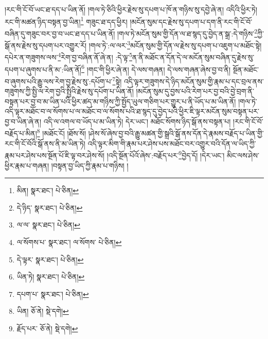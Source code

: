 །རང་གི་ངོ་བོ་ཡང་ཐ་དད་པ་ཡིན་ནོ། །གལ་ཏེ་ཅིའི་ཕྱིར་རྗེས་སུ་དཔག་པ་ཁོ་ན་གཉིས་སུ་དབྱེ་ཞེ་ན། འདིའི་ཕྱིར་ཏེ། རང་གི་མཚན་ཉིད་བསྟན་བྱ་ཡིན།\footnote{མིན།  སྣར་ཐང་།  པེ་ཅིན། } གཟུང་ཐ་དད་ཕྱིར། །མངོན་སུམ་དང་རྗེས་སུ་དཔག་པ་དག་ནི་རང་གི་ངོ་བོ་བཞིན་དུ་གཟུང་བར་བྱ་བ་ཡང་ཐ་དད་པ་ཡིན་ནོ། །གལ་ཏེ་མངོན་སུམ་གྱི་དོན་ལ་ཐ་སྙད་དུ་བྱེད་ན་སྒྲ་:དེ་གཉིས་\footnote{དེ་ཉིད་  སྣར་ཐང་།  པེ་ཅིན། }ཀྱི་སྒོ་ནས་རྗེས་སུ་དཔག་པར་འགྱུར་རོ། །གལ་ཏེ་:ལ་ལར་\footnote{ལ་ལ་  སྣར་ཐང་།  པེ་ཅིན། }མངོན་སུམ་གྱི་དོན་ལ་རྗེས་སུ་དཔག་པ་འཇུག་པ་མཐོང་སྟེ། དཔེར་ན་གཟུགས་ལས་\footnote{ལ་སོགས་པ་  སྣར་ཐང་། ལ་སོགས་  པེ་ཅིན། }རེག་བྱ་བཞིན་ནོ་ཞེ་ན། :དེ་ལྟ་\footnote{དེ་ལྟར་  སྣར་ཐང་།  པེ་ཅིན། }ན་ནི་མཐོང་ན་དོན་དེ་ལ་མངོན་སུམ་བཞིན་དུ་རྗེས་སུ་དཔག་པ་ཞུགས་པ་ནི་མ་:ཡིན་ནོ།\footnote{ཡིན་ཏེ།  སྣར་ཐང་།  པེ་ཅིན། } །གང་གི་ཕྱིར་ཞེ་ན། དེ་ལས་གཞན། དེ་ལས་གཞན་ཞེས་བྱ་བ་ནི། སྔོན་མཐོང་བ་ཞུགས་པའི་རྒྱུ་ལས་རེག་བྱ་རྗེས་སུ་:དཔོག་པ་\footnote{དཔག་པ་  སྣར་ཐང་།  པེ་ཅིན། }སྟེ། འདི་ལྟར་གཟུགས་དེ་ཉིད་མངོན་སུམ་གྱི་རྣམ་པ་དང་བྲལ་ནས་གཟུགས་ཀྱི་སྤྱི་ལ་རེག་བྱའི་སྤྱིའི་རྗེས་སུ་དཔོག་པ་ཡིན་ནོ། །མངོན་སུམ་དུ་བྱས་པའི་རེག་པར་བྱ་བའི་བྱེ་བྲག་ནི་བསྟན་པར་བྱ་བ་མ་ཡིན་པའི་ཕྱིར་ཚད་མ་གཉིས་ཀྱི་སྤྱོད་ཡུལ་གཅིག་པར་གྱུར་པ་ནི་ཡོད་པ་མ་ཡིན་ནོ། །གལ་ཏེ་འདི་ལྟར་མཐོང་བ་ལ་སོགས་པ་ལ་མཐོང་བ་ལ་སོགས་པའི་ཐ་སྙད་དུ་བྱེད་པའི་ཕྱིར་ཇི་ལྟར་མངོན་སུམ་བསྟན་པར་བྱ་བ་ཡིན་ཞེ་ན། འདི་ལ་འགལ་བ་ཡོད་པ་མ་ཡིན་ཏེ། དེར་ཡང་། མཐོང་སོགས་ཉིད་སྒོ་ནས་བསྟན་པ། །རང་གི་ངོ་བོ་བརྗོད་པ་མིན།\footnote{ཡིན།  ཅོ་ནེ།  སྡེ་དགེ། } །མཐོང་ངོ། །ཐོས་སོ། །ཤེས་སོ་ཞེས་བྱ་བའི་རྒྱུ་མཚན་གྱི་སྒྲའི་སྒོ་ནས་དོན་དེ་རྣམས་བརྗོད་པ་ཡིན་གྱི་རང་གི་ངོ་བོའི་སྒོ་ནས་ནི་མ་ཡིན་ཏེ། འདི་ལྟར་མིག་གི་རྣམ་པར་ཤེས་པས་མཐོང་བར་འགྱུར་བའི་དོན་ལ་ཡིད་ཀྱི་རྣམ་པར་ཤེས་པས་སྔོན་པོ་ཇི་ལྟ་བར་ཤེས་སོ། །འདི་སྔོན་པོའོ་ཞེས་:བརྗོད་པར་\footnote{རྗོད་པར་  ཅོ་ནེ།  སྡེ་དགེ། }བྱེད་དོ། །དེར་ཡང་། མིང་ལས་ཤེས་ཕྱིར་རྣམ་པ་གཞན། །བསྟན་བྱ་ཡིད་ཀྱི་རྣམ་པ་གཉིས། །
